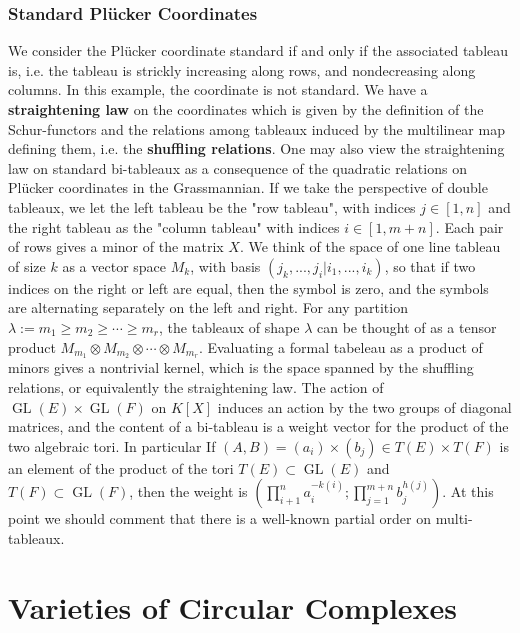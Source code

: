 \documentclass[11pt,oneside]{amsbook}
\numberwithin{equation}{section}
\theoremstyle{plain}
\theoremstyle{definition}
\theoremstyle{remark}
\DeclareMathOperator{\GL}{\mathrm{GL}}
\begin{document}
		\subsection{Standard Pl\"{u}cker Coordinates}\label{Plucker monomial orders}
		We consider the Pl\"{u}cker coordinate standard if and only if the associated tableau is, i.e. the tableau is strickly increasing along rows, and nondecreasing along columns. In this example, the coordinate is not standard. We have a \textbf{straightening law} on the coordinates which is given by the definition of the Schur-functors and the relations among tableaux induced by the multilinear map defining them, i.e. the \textbf{shuffling relations}. One may also view the straightening law on standard bi-tableaux as a consequence of the quadratic relations on Pl\"{u}cker coordinates in the Grassmannian. If we take the perspective of double tableaux, we let the left tableau be the "row tableau", with indices $j \in [1,n]$ and the right tableau as the "column tableau" with indices $i \in [1,m+n]$. Each pair of rows gives a minor of the matrix $X$. We think of the space of one line tableau of size $k$ as a vector space $M_k$, with basis $(j_k, ..., j_i|i_1, ..., i_k)$, so that if two indices on the right or left are equal, then the symbol is zero, and the symbols are alternating separately on the left and right. For any partition $\lambda:= m_1 \geq m_2 \geq \cdots \geq m_r$, the tableaux of shape $\lambda$ can be thought of as a tensor product $M_{m_1} \otimes M_{m_2} \otimes \cdots \otimes M_{m_r}$. Evaluating a formal tabeleau as a product of minors gives a nontrivial kernel, which is the space spanned by the shuffling relations, or equivalently the straightening law. The action of $\GL(E) \times \GL(F)$ on $K[X]$ induces an action by the two groups of diagonal matrices, and the content of a bi-tableau is a weight vector for the product of the two algebraic tori. In particular If $(A,B) = (a_i) \times (b_j) \in T(E) \times T(F)$ is an element of the product of the tori $T(E) \subset \GL(E)$ and $T(F) \subset \GL(F)$, then the weight is $(\prod_{i+1}^n a_i^{-k(i)}; \prod_{j=1}^{m+n} b_j^{h(j)})$. At this point we should comment that there is a well-known partial order on multi-tableaux. 
		
		
		\chapter{Varieties of Circular Complexes}
\end{document}
